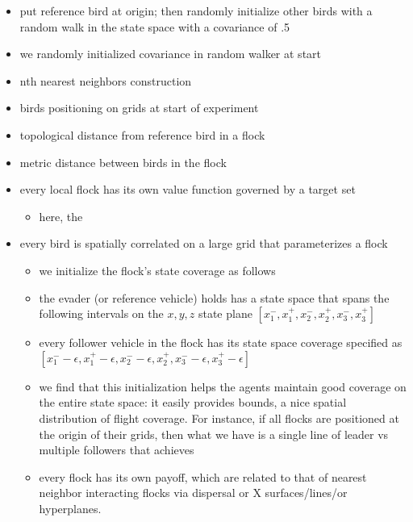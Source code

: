 \begin{itemize}
	\item put reference bird at origin; then randomly initialize other birds with a random walk in the state space with a covariance of .5~\cite{LekanCASE2016Paper}
	\item we randomly initialized covariance in random walker at start
	\item nth nearest neighbors construction~\cite{VicsekPhaseNovel}
	\item birds positioning on grids at start of experiment
	\item topological distance from reference bird in a flock~\cite{JadbabaieCoord}
	\item metric distance between birds in the flock
	\item every local flock has its own value function governed by a target set
	\begin{itemize}
		\item here, the 
	\end{itemize}
	\item every bird is spatially correlated on a large grid that parameterizes a flock
	\begin{itemize}
		\item we initialize the flock's state coverage as follows
		\item the evader (or reference vehicle) holds has a state space that spans the following intervals on the $x,y,z$ state plane
		$[x_1^-, x_1^+, x_2^-, x_2^+, x_3^-, x_3^+]$
		\item every follower vehicle in the flock has its state space coverage specified as
		$[x_1^- -\epsilon, x_1^+ - \epsilon, x_2^- -\epsilon, x_2^+, x_3^- -\epsilon, x_3^+ - \epsilon]$
		\item we find that this initialization helps the agents maintain good coverage on the entire state space: it easily provides bounds, a nice spatial distribution of flight coverage. For instance, if all flocks are positioned at the origin of their grids, then what we have is a single line of leader vs multiple followers that achieves
		\item every flock has its own payoff, which are related to that of nearest neighbor interacting flocks via dispersal or X surfaces/lines/or hyperplanes.
	\end{itemize}
	

\end{itemize}
